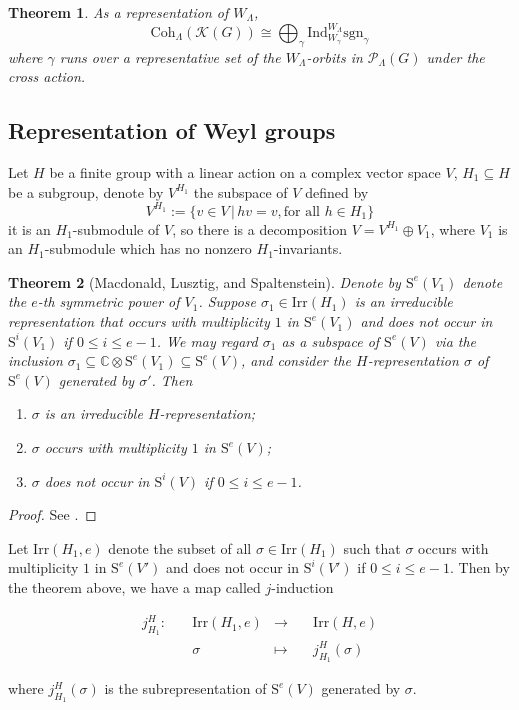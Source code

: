 \documentclass[12pt, a4paper]{amsart}
\numberwithin{equation}{section}
\newtheorem{thm}{Theorem}[section]
\newcommand{\BC}{{\mathbb {C}}}
\newcommand{\CK}{{\mathcal {K}}}
\newcommand{\CP}{{\mathcal {P}}}
\newcommand{\Irr}{{\mathrm{Irr}}}
\newcommand{\sgn}{{\mathrm{sgn}}}
\newcommand{\set}[2]{\{#1\,|\,#2\}}
\newcommand{\defmap}[5]{
           \begin{equation*}
              \begin{aligned}
                   #1:\quad  & #2 &\longrightarrow &\quad #3 \\
                      \quad  & #4    &\longmapsto  &\quad #5
              \end{aligned}
           \end{equation*}
          }
\begin{document}
\begin{thm}\label{Coh} 
As a representation of $W_{\Lambda}$,
    \begin{equation}
        \mathrm{Coh}_{\Lambda}(\CK(G)) \cong \bigoplus_{\gamma} \mathrm{Ind}_{W_{\gamma}}^{W_{\Lambda}} \sgn_{\gamma}
    \end{equation}
    where $\gamma$ runs over a representative set of the $W_{\Lambda}$-orbits in $\CP_{\Lambda}(G)$ under the cross action.
\end{thm}


\subsection{Representation of Weyl groups}\label{2.2}
Let $H$ be a finite group with a linear action on a complex vector space $V$, $H_1 \subseteq H$ be a subgroup, denote by $V^{H_1}$ the subspace of $V$ defined by
$$V^{H_1} := \set{v \in V}{hv = v, \textrm{for all $h \in H_1$}}$$
it is an $H_1$-submodule of $V$, so there is a decomposition $V = V^{H_1} \oplus V_1$, where $V_1$ is an $H_1$-submodule which has no nonzero $H_1$-invariants.

\begin{thm}[Macdonald, Lusztig, and Spaltenstein]\label{j-ind}
    Denote by $\mathrm{S}^e(V_1)$ denote the $e$-th symmetric power of $V_1$. Suppose $\sigma_1 \in \Irr(H_1)$ is an irreducible representation that occurs with multiplicity $1$ in $\mathrm{S}^e(V_1)$ and does not occur in $\mathrm{S}^{i}(V_1)$ if $0 \leq i \leq e-1$. We may regard $\sigma_1$ as a subspace of $\mathrm{S}^e(V)$ via the inclusion $\sigma_1 \subseteq \BC \otimes \mathrm{S}^e(V_1) \subseteq \mathrm{S}^e(V)$, and consider the $H$-representation $\sigma$ of $\mathrm{S}^e(V)$ generated by $\sigma'$. Then
    \begin{enumerate}
        \item $\sigma$ is an irreducible $H$-representation;
        \item $\sigma$ occurs with multiplicity $1$ in $\mathrm{S}^e(V)$;
        \item $\sigma$ does not occur in $\mathrm{S}^{i}(V)$ if $0 \leq i \leq e-1$.
    \end{enumerate}
\end{thm}

\begin{proof}
    See \cite[Theorem 11.2.1]{Car}.
\end{proof}

Let $\Irr(H_1,e)$ denote the subset of all $\sigma \in \Irr(H_1)$ such that $\sigma$ occurs with multiplicity $1$ in $\mathrm{S}^e(V')$ and does not occur in $\mathrm{S}^{i}(V')$ if $0 \leq i \leq e-1$.  Then by the theorem above, we have a map called $j$-induction
\defmap{j_{H_1}^H}{\Irr(H_1,e)}{\Irr(H,e)}{\sigma}{j_{H_1}^{H}(\sigma)}
where $j_{H_1}^{H}(\sigma)$ is the subrepresentation of $\mathrm{S}^e(V)$ generated by $\sigma$.
\end{document}
